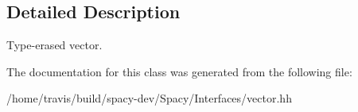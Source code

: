 \subsection{Detailed Description}
Type-\/erased vector. 

The documentation for this class was generated from the following file\-:\begin{DoxyCompactItemize}
\item 
/home/travis/build/spacy-\/dev/\-Spacy/\-Interfaces/vector.\-hh\end{DoxyCompactItemize}
